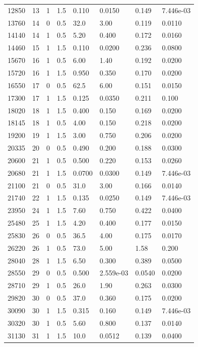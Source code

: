 \documentclass[preview]{standalone}
\begin{document}
{{\begin{tabular}{L{1.2cm}C{1.2cm} C{0.3cm}C{0.5cm} C{1.4cm}C{1.4cm} C{1.4cm}C{1.4cm}}
  12850  &    13  & 1     & 1.5 &  0.110  & 0.0150  & 0.149 &  7.446e-03   \\ 
  13760  &    14  & 0     & 0.5 &  32.0  & 3.00  & 0.119 &  0.0110   \\ 
  14140  &    14  & 1     & 0.5 &  5.20  & 0.400  & 0.172 &  0.0160   \\ 
  14460  &    15  & 1     & 1.5 &  0.110  & 0.0200  & 0.236 &  0.0800   \\ 
  15670  &    16  & 1     & 0.5 &  6.00  & 1.40  & 0.192 &  0.0200   \\ 
  15720  &    16  & 1     & 1.5 &  0.950  & 0.350  & 0.170 &  0.0200   \\ 
  16550  &    17  & 0     & 0.5 &  62.5  & 6.00  & 0.151 &  0.0150   \\ 
  17300  &    17  & 1     & 1.5 &  0.125  & 0.0350  & 0.211 &  0.100   \\ 
  18020  &    18  & 1     & 1.5 &  0.400  & 0.150  & 0.169 &  0.0200   \\ 
  18145  &    18  & 1     & 0.5 &  4.00  & 0.150  & 0.218 &  0.0200   \\ 
  19200  &    19  & 1     & 1.5 &  3.00  & 0.750  & 0.206 &  0.0200   \\ 
  20335  &    20  & 0     & 0.5 &  0.490  & 0.200  & 0.188 &  0.0300   \\ 
  20600  &    21  & 1     & 0.5 &  0.500  & 0.220  & 0.153 &  0.0260   \\ 
  20680  &    21  & 1     & 1.5 &  0.0700  & 0.0300  & 0.149 &  7.446e-03   \\ 
  21100  &    21  & 0     & 0.5 &  31.0  & 3.00  & 0.166 &  0.0140   \\ 
  21740  &    22  & 1     & 1.5 &  0.135  & 0.0250  & 0.149 &  7.446e-03   \\ 
  23950  &    24  & 1     & 1.5 &  7.60  & 0.750  & 0.422 &  0.0400   \\ 
  25480  &    25  & 1     & 1.5 &  4.20  & 0.400  & 0.177 &  0.0150   \\ 
  25830  &    26  & 0     & 0.5 &  36.5  & 4.00  & 0.175 &  0.0170   \\ 
  26220  &    26  & 1     & 0.5 &  73.0  & 5.00  & 1.58 &  0.200   \\ 
  28040  &    28  & 1     & 1.5 &  6.50  & 0.300  & 0.389 &  0.0500   \\ 
  28550  &    29  & 0     & 0.5 &  0.500  & 2.559e-03  & 0.0540 &  0.0200   \\ 
  28710  &    29  & 1     & 0.5 &  26.0  & 1.90  & 0.263 &  0.0300   \\ 
  29820  &    30  & 0     & 0.5 &  37.0  & 0.360  & 0.175 &  0.0200   \\ 
  30090  &    30  & 1     & 1.5 &  0.315  & 0.160  & 0.149 &  7.446e-03   \\ 
  30320  &    30  & 1     & 0.5 &  5.60  & 0.800  & 0.137 &  0.0140   \\ 
  31130  &    31  & 1     & 1.5 &  10.0  & 0.0512  & 0.139 &  0.0400   \\ 
\hline 
\end{tabular} 

}}
\end{document}
